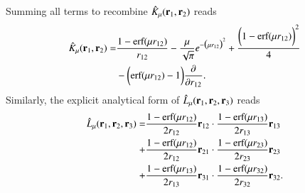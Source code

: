\documentclass[aip,jcp,reprint,noshowkeys,superscriptaddress]{revtex4-1}
\newcommand{\deriv}[3]{\frac{\partial^{#3} #1}{\partial {#2}^{#3}}}
\newcommand{\bri}[1]{{\bf r}_{#1}}
\begin{document}
Summing all terms to recombine $\hat{K}_\mu(\bri{1},\bri{2})$ reads 
\begin{equation}
 \label{eq:k_final}
  \begin{aligned}
   \hat{K}_\mu(\bri{1},\bri{2}) = & \frac{1 - \text{erf}(\mu r_{12})}{r_{12}} - \frac{\mu}{\sqrt{\pi}} e^{-\big(\mu r_{12} \big)^2} + \frac{\bigg(1 -     \text{erf}(\mu r_{12}) \bigg)^2}{4} \\
& - \bigg( \text{erf}(\mu r_{12}) - 1\bigg) \deriv{}{r_{12}}{}.
  \end{aligned}
\end{equation}
Similarly, the explicit analytical form of $\hat{L}_\mu(\bri{1},\bri{2},\bri{3}) $ reads 
\begin{equation}
 \label{eq:l_final}
 \begin{aligned}
 \hat{L}_\mu(\bri{1},\bri{2},\bri{3}) = & \frac{1 - \text{erf}(\mu r_{12})}{2 r_{12}} \bri{12} \cdot \frac{1 - \text{erf}(\mu r_{13})}{2 r_{13}} \bri{13} \\
                                      + & \frac{1 - \text{erf}(\mu r_{12})}{2 r_{12}} \bri{21} \cdot \frac{1 - \text{erf}(\mu r_{23})}{2 r_{23}} \bri{23} \\
                                      + & \frac{1 - \text{erf}(\mu r_{13})}{2 r_{13}} \bri{31} \cdot \frac{1 - \text{erf}(\mu r_{32})}{2 r_{32}} \bri{32}.
 \end{aligned}                    
\end{equation}
\end{document}
